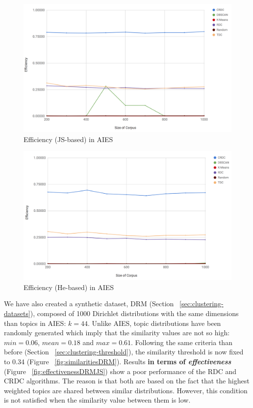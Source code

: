 \begin{figure}
  \includegraphics[scale=0.27]{efficiencyJS.png}
  \caption{Efficiency (JS-based) in AIES}
  \label{fig:efficiencyJS}
\end{figure}

\begin{figure}
  \includegraphics[scale=0.27]{efficiencyHe.png}
  \caption{Efficiency (He-based) in AIES}
  \label{fig:efficiencyHe}
\end{figure}

We have also created a synthetic dataset, DRM (Section ~\ref{sec:clustering-datasets}), composed of 1000 Dirichlet distributions with the same dimensions than topics in AIES: $k=44$. Unlike AIES, topic distributions have been randomly generated which imply that the similarity values are not so high: $min=0.06$, $mean=0.18$ and $max=0.61$. Following the same criteria than before (Section ~\ref{sec:clustering-threshold}), the similarity threshold is now fixed to 0.34 (Figure ~\ref{fig:similaritiesDRM}). Results \textbf{in terms of \textit{effectiveness}} (Figure ~\ref{fig:effectivenessDRMJS}) show a poor performance of the RDC and CRDC algorithms. The reason is that both are based on the fact that the highest weighted topics are shared between similar distributions. However, this condition is not satisfied when the similarity value between them is low.


